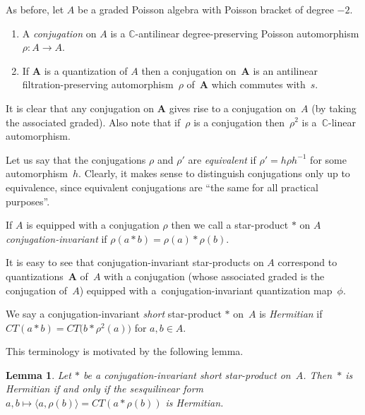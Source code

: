 \documentclass[pdftex]{sigma}
\numberwithin{equation}{section}
\newtheorem{Lemma}[Theorem]{Lemma}
\begin{document}
As before, let $A$ be a graded Poisson algebra with Poisson bracket of degree $-2$.

\begin{Definition} \quad
\begin{enumerate}\itemsep=0pt
\item[(i)] A {\it conjugation} on $A$ is a ${\mathbb C}$-antilinear degree-preserving Poisson automorphism $\rho\colon A\to A$.
\item[(ii)] If ${\mathbf A}$ is a quantization of $A$ then a conjugation on~${\mathbf A}$ is an antilinear filtration-preserving automorphism~$\rho$ of~${\mathbf A}$ which commutes with~$s$.
\end{enumerate}
\end{Definition}

It is clear that any conjugation on ${\mathbf A}$ gives rise to a conjugation on~$A$ (by taking the associated graded). Also note that if~$\rho$ is a conjugation then~$\rho^2$ is a~${\mathbb C}$-linear automorphism.

Let us say that the conjugations $\rho$ and $\rho'$ are {\it equivalent} if $\rho'=h\rho h^{-1}$
for some automorphism~$h$. Clearly, it makes sense to distinguish conjugations only up to equivalence, since
equivalent conjugations are ``the same for all practical purposes''.

\begin{Definition} If $A$ is equipped with a conjugation $\rho$ then we call a star-product $*$ on $A$ {\it conjugation-invariant} if $\rho(a*b)=\rho(a)*\rho(b)$.
\end{Definition}

It is easy to see that conjugation-invariant star-products on $A$ correspond
to quantizations~${\mathbf A}$ of~$A$ with a conjugation (whose associated graded is the conjugation of~$A$) equipped with a~conjugation-invariant quantization map~$\phi$.

\begin{Definition} We say a conjugation-invariant {\sl short} star-product $*$ on~$A$ is {\it Hermitian} if $CT(a*b)=CT\big(b*\rho^2(a)\big)$ for $a,b\in A$.
\end{Definition}

This terminology is motivated by the following lemma.

\begin{Lemma}\label{herm} Let $*$ be a conjugation-invariant short star-product on~$A$. Then~$*$ is Hermitian if and only if the sesquilinear form $a,b\mapsto \langle a,\rho(b)\rangle=CT(a*\rho(b))$ is Hermitian.
\end{Lemma}
\end{document}
